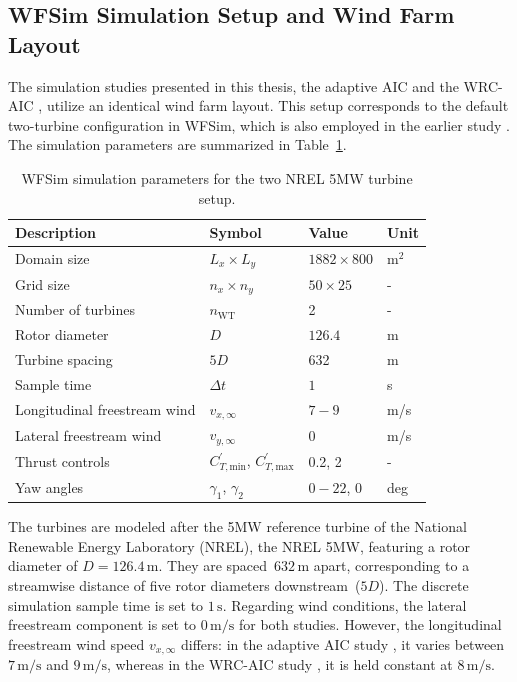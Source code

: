 \subsection{WFSim Simulation Setup and Wind Farm Layout}
The simulation studies presented in this thesis, the adaptive AIC \cite{dittmer2022data} and the WRC-AIC \cite{dittmer2023koopman}, utilize an identical wind farm layout. This setup corresponds to the default two-turbine configuration in WFSim, which is also employed in the earlier study \cite{sharan2022Koopman}. The simulation parameters are summarized in Table~\ref{table:WfSim}. 
%
\begin{table}[ht]
    \centering
    \caption{WFSim simulation parameters for the two NREL 5MW turbine setup.}
    \label{table:WfSim}
    \begin{tabular}{l l l l} 
        \toprule
        Description & Symbol & Value & Unit\\
        \midrule
        Domain size &$L_x\times L_y$ & $1882\times 800$& $\text{m}^2$ \\
        Grid size  &$n_x\times n_y$ & $50\times 25$ & -\\
        Number of turbines& $n_{\text{WT}}$ & 2 & - \\
        Rotor diameter & $D$  & $126.4$& m \\
        Turbine spacing & $5D$ & 632 & m\\
        Sample time &$\Delta t$ & $1$ & s \\
        Longitudinal freestream wind &$v_{x,\infty}$&  $7 - 9$ & m/s \\
        Lateral freestream wind &$v_{y,\infty}$  & $0$ & m/s \\         
        Thrust controls & $C^{\prime}_{T,\text{min}}$, $C^{\prime}_{T,\text{max}}$ & 0.2, 2 & -\\
        Yaw angles &$\gamma_1$, $\gamma_2$ &  $0 - 22$, $0$ & deg\\
        \bottomrule
    \end{tabular}
\end{table}
%
The turbines are modeled after the 5MW reference turbine of the National Renewable Energy Laboratory (NREL), the NREL 5MW, featuring a rotor diameter of $D = 126.4\,\text{m}$. They are spaced~$632\,\text{m}$ apart, corresponding to a streamwise distance of five rotor diameters downstream~($5D$). The discrete simulation sample time is set to $1\,\text{s}$. Regarding wind conditions, the lateral freestream component is set to $0\,\text{m/s}$ for both studies. However, the longitudinal freestream wind speed $v_{x,\infty}$ differs: in the adaptive AIC study \cite{dittmer2022data}, it varies between $7\,\text{m/s}$ and $9\,\text{m/s}$, whereas in the WRC-AIC study \cite{dittmer2023koopman}, it is held constant at $8\,\text{m/s}$.

